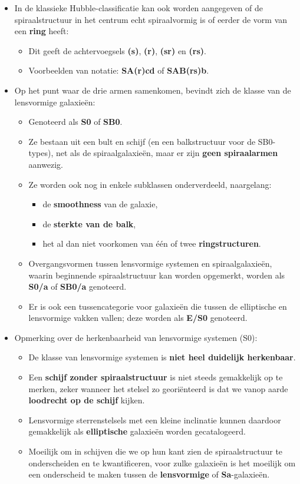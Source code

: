 \documentclass[10pt,a4paper]{article}
\begin{document}
\begin{itemize}
  \item In de klassieke Hubble-classificatie kan ook worden aangegeven of de spiraalstructuur in het centrum echt spiraalvormig is of eerder de vorm van een \textbf{ring} heeft:
  \begin{itemize}
    \item Dit geeft de achtervoegsels \textbf{(s)}, \textbf{(r)}, \textbf{(sr)} en \textbf{(rs)}.
    \item Voorbeelden van notatie: \textbf{SA(r)cd} of \textbf{SAB(rs)b}.
  \end{itemize}

  \item Op het punt waar de drie armen samenkomen, bevindt zich de klasse van de lensvormige galaxieën:
  \begin{itemize}
    \item Genoteerd als \textbf{S0} of \textbf{SB0}.
    \item Ze bestaan uit een bult en schijf (en een balkstructuur voor de SB0-types), net als de spiraalgalaxieën, maar er zijn \textbf{geen spiraalarmen} aanwezig.
    \item Ze worden ook nog in enkele subklassen onderverdeeld, naargelang:
    \begin{itemize}
      \item de \textbf{smoothness} van de galaxie,
      \item de \textbf{sterkte van de balk},
      \item het al dan niet voorkomen van één of twee \textbf{ringstructuren}.
    \end{itemize}
    \item Overgangsvormen tussen lensvormige systemen en spiraalgalaxieën, waarin beginnende spiraalstructuur kan worden opgemerkt, worden als \textbf{S0/a} of \textbf{SB0/a} genoteerd.
    \item Er is ook een tussencategorie voor galaxieën die tussen de elliptische en lensvormige vakken vallen; deze worden als \textbf{E/S0} genoteerd.
  \end{itemize}

  \item Opmerking over de herkenbaarheid van lensvormige systemen (S0):
  \begin{itemize}
    \item De klasse van lensvormige systemen is \textbf{niet heel duidelijk herkenbaar}.
    \item Een \textbf{schijf zonder spiraalstructuur} is niet steeds gemakkelijk op te merken, zeker wanneer het stelsel zo georiënteerd is dat we vanop aarde \textbf{loodrecht op de schijf} kijken.
    \item Lensvormige sterrenstelsels met een kleine inclinatie kunnen daardoor gemakkelijk als \textbf{elliptische} galaxieën worden gecatalogeerd.
    \item Moeilijk om in schijven die we op hun kant zien de spiraalstructuur te onderscheiden en te kwantificeren, voor zulke galaxieën is het moeilijk om een onderscheid te maken tussen de \textbf{lensvormige} of \textbf{Sa}-galaxieën.
  \end{itemize}
\end{itemize}
\end{document}
